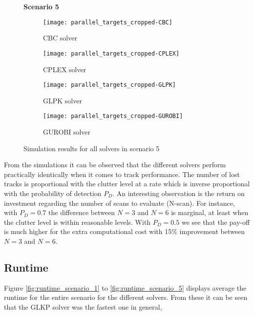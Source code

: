 \begin{figure}[H]
    \centering
    \textbf{Scenario 5}\par \medskip
    \begin{subfigure}{0.49\textwidth}
        \centering
        \texttt{[image: parallel\_targets\_cropped-CBC]}
        \caption{CBC solver}
    \end{subfigure}
    \begin{subfigure}{0.49\textwidth}
        \centering
        \texttt{[image: parallel\_targets\_cropped-CPLEX]}
        \caption{CPLEX solver}
    \end{subfigure}
    \begin{subfigure}{0.49\textwidth}
        \centering
        \texttt{[image: parallel\_targets\_cropped-GLPK]}
        \caption{GLPK solver}
    \end{subfigure}
    \begin{subfigure}{0.49\textwidth}
        \centering
        \texttt{[image: parallel\_targets\_cropped-GUROBI]}
        \caption{GUROBI solver}
    \end{subfigure}
    \caption{Simulation results for all solvers in scenario 5}
    \label{fig:parallel_targets_cropped}
\end{figure} 
From the simulations it can be observed that the different solvers perform practically identically when it comes to track performance. The number of lost tracks is proportional with the clutter level at a rate which is inverse proportional with the probability of detection $P_D$. An interesting observation is the return on investment regarding the number of scans to evaluate (N-scan). For instance, with $P_D=0.7$ the difference between $N=3$ and $N=6$ is marginal, at least when the clutter level is within reasonable levels. With $P_D=0.5$ we see that the pay-off is much higher for the extra computational cost with 15\% improvement between $N=3$ and $N=6$.
\subsection{Runtime}
Figure \ref{fig:runtime_scenario_1} to \ref{fig:runtime_scenario_5} displays average the runtime for the entire scenario for the different solvers. From these it can be seen that the GLKP solver was the fastest one in general,

